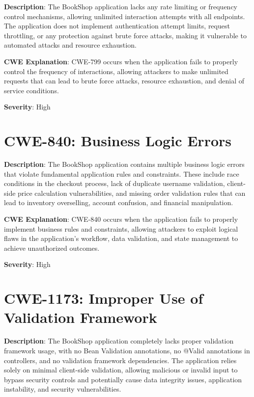 \documentclass[]{UCD_CS_FYP_Report}
\begin{document}
\textbf{Description}: The BookShop application lacks any rate limiting or frequency control mechanisms, allowing unlimited interaction attempts with all endpoints. The application does not implement authentication attempt limits, request throttling, or any protection against brute force attacks, making it vulnerable to automated attacks and resource exhaustion.

\textbf{CWE Explanation}: CWE-799 occurs when the application fails to properly control the frequency of interactions, allowing attackers to make unlimited requests that can lead to brute force attacks, resource exhaustion, and denial of service conditions.

\textbf{Severity}: High



\section{CWE-840: Business Logic Errors}

\textbf{Description}: The BookShop application contains multiple business logic errors that violate fundamental application rules and constraints. These include race conditions in the checkout process, lack of duplicate username validation, client-side price calculation vulnerabilities, and missing order validation rules that can lead to inventory overselling, account confusion, and financial manipulation.

\textbf{CWE Explanation}: CWE-840 occurs when the application fails to properly implement business rules and constraints, allowing attackers to exploit logical flaws in the application's workflow, data validation, and state management to achieve unauthorized outcomes.

\textbf{Severity}: High



\section{CWE-1173: Improper Use of Validation Framework}

\textbf{Description}: The BookShop application completely lacks proper validation framework usage, with no Bean Validation annotations, no @Valid annotations in controllers, and no validation framework dependencies. The application relies solely on minimal client-side validation, allowing malicious or invalid input to bypass security controls and potentially cause data integrity issues, application instability, and security vulnerabilities.
\end{document}
